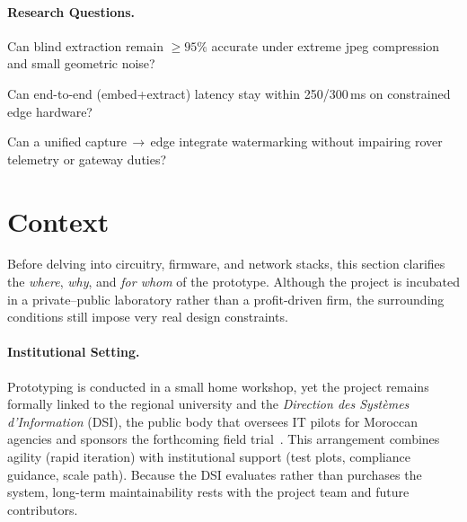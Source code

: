 \paragraph{Research Questions.}
\begin{description}[leftmargin=2.1cm,style=sameline]
  \item[RQ1] Can blind extraction remain $\ge 95\%$ accurate under extreme \gls{jpeg} compression and small geometric noise?
  \item[RQ2] Can end-to-end (embed+extract) latency stay within 250/300\,ms on constrained edge hardware?
  \item[RQ3] Can a unified capture\,$\rightarrow$\,edge  integrate watermarking without impairing rover telemetry or gateway duties?
\end{description}

\section{Context}
\label{sec:intro:context}

Before delving into circuitry, firmware, and network stacks, this
section clarifies the \emph{where}, \emph{why}, and \emph{for whom} of
the prototype.
Although the project is incubated in a private–public
laboratory rather than a profit-driven firm, the surrounding conditions
still impose very real design constraints.

\paragraph{\textbf{Institutional Setting.}}
Prototyping is conducted in a small home workshop, yet the project
remains formally linked to the regional university and the
\emph{Direction des Systèmes d’Information} (DSI), the public body that
oversees IT pilots for Moroccan agencies and sponsors the forthcoming
field trial~\cite{dsi2025,ministereDSI2024}.
This arrangement combines agility (rapid iteration) with institutional support (test plots, compliance guidance, scale path).
Because the DSI evaluates rather than purchases the system, long-term maintainability rests with the project
team and future contributors.

